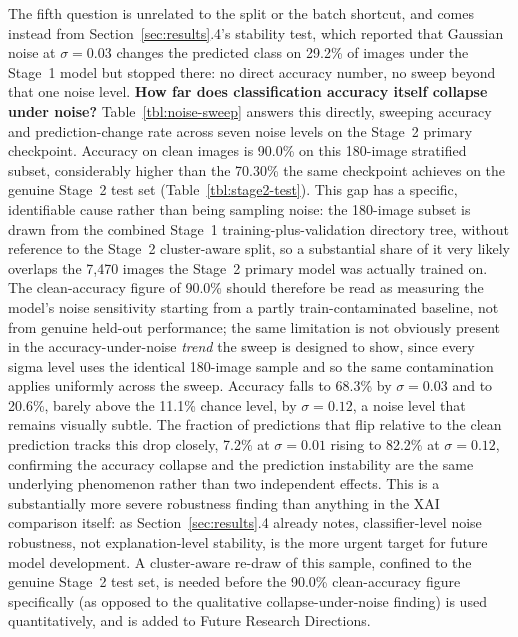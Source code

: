 The fifth question is unrelated to the split or the batch shortcut, and comes instead from Section~\ref{sec:results}.4's stability test, which reported that Gaussian noise at $\sigma=0.03$ changes the predicted class on 29.2\% of images under the Stage~1 model but stopped there: no direct accuracy number, no sweep beyond that one noise level. \textbf{How far does classification accuracy itself collapse under noise?} Table~\ref{tbl:noise-sweep} answers this directly, sweeping accuracy and prediction-change rate across seven noise levels on the Stage~2 primary checkpoint. Accuracy on clean images is 90.0\% on this 180-image stratified subset, considerably higher than the 70.30\% the same checkpoint achieves on the genuine Stage~2 test set (Table~\ref{tbl:stage2-test}). This gap has a specific, identifiable cause rather than being sampling noise: the 180-image subset is drawn from the combined Stage~1 training-plus-validation directory tree, without reference to the Stage~2 cluster-aware split, so a substantial share of it very likely overlaps the 7,470 images the Stage~2 primary model was actually trained on. The clean-accuracy figure of 90.0\% should therefore be read as measuring the model's noise sensitivity starting from a partly train-contaminated baseline, not from genuine held-out performance; the same limitation is not obviously present in the accuracy-under-noise \textit{trend} the sweep is designed to show, since every sigma level uses the identical 180-image sample and so the same contamination applies uniformly across the sweep. Accuracy falls to 68.3\% by $\sigma=0.03$ and to 20.6\%, barely above the 11.1\% chance level, by $\sigma=0.12$, a noise level that remains visually subtle. The fraction of predictions that flip relative to the clean prediction tracks this drop closely, 7.2\% at $\sigma=0.01$ rising to 82.2\% at $\sigma=0.12$, confirming the accuracy collapse and the prediction instability are the same underlying phenomenon rather than two independent effects. This is a substantially more severe robustness finding than anything in the XAI comparison itself: as Section~\ref{sec:results}.4 already notes, classifier-level noise robustness, not explanation-level stability, is the more urgent target for future model development. A cluster-aware re-draw of this sample, confined to the genuine Stage~2 test set, is needed before the 90.0\% clean-accuracy figure specifically (as opposed to the qualitative collapse-under-noise finding) is used quantitatively, and is added to Future Research Directions.

